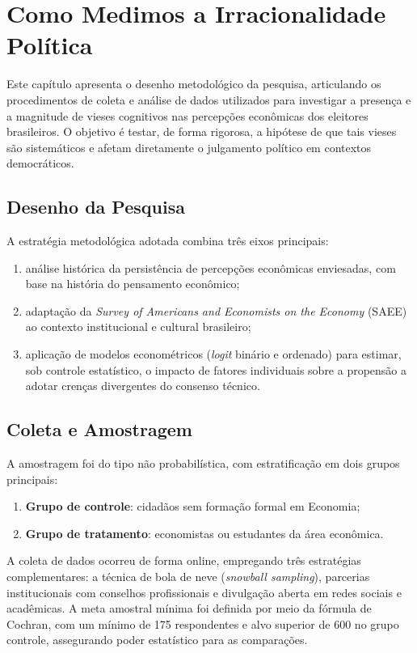 \chapter{Como Medimos a Irracionalidade Política}

Este capítulo apresenta o desenho metodológico da pesquisa, articulando os procedimentos de coleta e análise de dados utilizados para investigar a presença e a magnitude de vieses cognitivos nas percepções econômicas dos eleitores brasileiros. O objetivo é testar, de forma rigorosa, a hipótese de que tais vieses são sistemáticos e afetam diretamente o julgamento político em contextos democráticos.

\section{Desenho da Pesquisa}

A estratégia metodológica adotada combina três eixos principais:
\begin{enumerate}[label=\alph*)]
    \item análise histórica da persistência de percepções econômicas enviesadas, com base na história do pensamento econômico;
    \item adaptação da \textit{Survey of Americans and Economists on the Economy} (SAEE) ao contexto institucional e cultural brasileiro;
    \item aplicação de modelos econométricos (\textit{logit} binário e ordenado) para estimar, sob controle estatístico, o impacto de fatores individuais sobre a propensão a adotar crenças divergentes do consenso técnico.
\end{enumerate}

\section{Coleta e Amostragem}

A amostragem foi do tipo não probabilística, com estratificação em dois grupos principais:
\begin{enumerate}[label=\alph*)]
    \item \textbf{Grupo de controle}: cidadãos sem formação formal em Economia;
    \item \textbf{Grupo de tratamento}: economistas ou estudantes da área econômica.
\end{enumerate}

A coleta de dados ocorreu de forma online, empregando três estratégias complementares: a técnica de bola de neve (\textit{snowball sampling}), parcerias institucionais com conselhos profissionais e divulgação aberta em redes sociais e acadêmicas. A meta amostral mínima foi definida por meio da fórmula de Cochran, com um mínimo de 175 respondentes e alvo superior de 600 no grupo controle, assegurando poder estatístico para as comparações.

